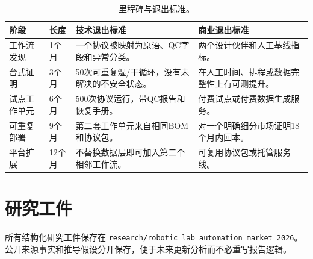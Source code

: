 \documentclass[11pt,fontset=none]{ctexart}
\newcommand{\artifactroot}{\texttt{research/robotic\_lab\_automation\_market\_2026}}
\begin{document}
\begin{table}[htbp]
\centering
\small
\begin{tabularx}{\linewidth}{@{}L{2.6cm}L{2.0cm}YY@{}}
\toprule
\textbf{阶段} & \textbf{长度} & \textbf{技术退出标准} & \textbf{商业退出标准} \\
\midrule
工作流发现 & 1个月 & 一个协议被映射为原语、QC字段和异常分类。 & 两个设计伙伴和人工基线指标。 \\
台式证明 & 3个月 & 50次可重复湿/干循环，没有未解决的不安全状态。 & 在人工时间、排程或数据完整性上有可测提升。 \\
试点工作单元 & 6个月 & 500次协议运行，带QC报告和恢复手册。 & 付费试点或付费数据生成服务。 \\
可重复部署 & 9个月 & 第二套工作单元来自相同BOM和协议包。 & 对一个明确细分市场证明18个月内回本。 \\
平台扩展 & 12个月 & 不替换数据层即可加入第二个相邻工作流。 & 可复用协议包或托管服务线。 \\
\bottomrule
\end{tabularx}
\caption{里程碑与退出标准。}
\label{tab:roadmap-cn}
\end{table}

\clearpage
\section{研究工件}

所有结构化研究工件保存在 \artifactroot。公开来源事实和推导假设分开保存，便于未来更新分析而不必重写报告逻辑。
\end{document}
